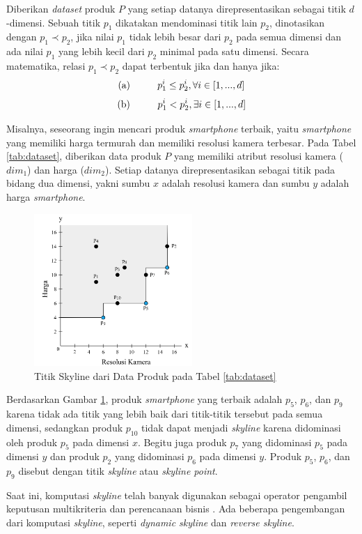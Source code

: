 Diberikan \textit{dataset} produk $P$ yang setiap datanya direpresentasikan sebagai titik $d$-dimensi. Sebuah titik $p_1$ dikatakan mendominasi titik lain $p_2$, dinotasikan dengan  $p_1 \prec p_2$, jika nilai $p_1$ tidak lebih besar dari $p_2$ pada semua dimensi dan ada nilai $p_1$ yang lebih kecil dari $p_2$ minimal pada satu dimensi. Secara matematika, relasi $p_1 \prec p_2$ dapat terbentuk jika dan hanya jika:
\[\text{(a)} \hspace*{1cm} p_1^i \leq p_2^i, \forall i \in [1, ..., d]\] 
\[\text{(b)} \hspace*{1cm} p_1^i < p_2^i, \exists i \in [1, ..., d]\]

Misalnya, seseorang ingin mencari produk \textit{smartphone} terbaik, yaitu \textit{smartphone} yang memiliki harga termurah dan memiliki resolusi kamera terbesar. Pada Tabel \ref{tab:dataset}, diberikan data produk $P$ yang memiliki atribut resolusi kamera ($dim_1$) dan harga ($dim_2$). Setiap datanya direpresentasikan sebagai titik pada bidang dua dimensi, yakni sumbu $x$ adalah resolusi kamera dan sumbu $y$ adalah harga \textit{smartphone}.

\begin{figure}[h]
	\centering
	\includegraphics[width=6cm]{bab2/img/skyline.png}
	\caption{Titik Skyline dari Data Produk pada Tabel \ref{tab:dataset}}
	\label{fig:skyline}
\end{figure}

Berdasarkan Gambar \ref{fig:skyline}, produk \textit{smartphone} yang terbaik adalah $p_5$, $p_6$, dan $p_9$ karena tidak ada titik yang lebih baik dari titik-titik tersebut pada semua dimensi, sedangkan produk $p_{10}$ tidak dapat menjadi \textit{skyline} karena didominasi oleh produk $p_5$ pada dimensi $x$. Begitu juga produk $p_7$ yang didominasi $p_5$ pada dimensi $y$ dan produk $p_2$ yang didominasi $p_6$ pada dimensi $y$. Produk $p_5$, $p_6$, dan $p_9$ disebut dengan titik \textit{skyline} atau \textit{skyline point}.

Saat ini, komputasi \textit{skyline} telah banyak digunakan sebagai operator pengambil keputusan multikriteria dan perencanaan bisnis \cite{dynamic-skyline-2}. Ada beberapa pengembangan dari komputasi \textit{skyline}, seperti \textit{dynamic skyline} dan \textit{reverse skyline}.  

